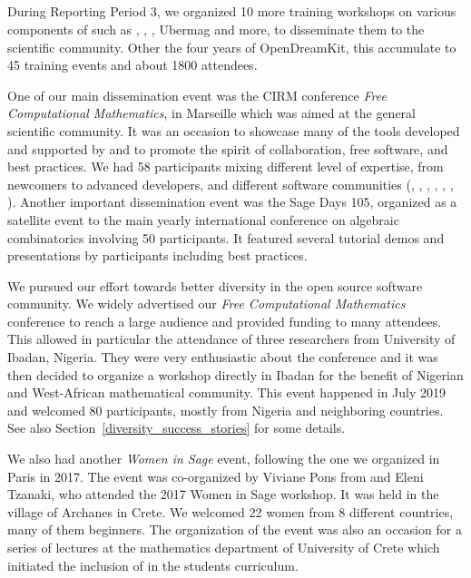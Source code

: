 {\subparagraph{}
\label{dissem@dissemination}

During Reporting Period 3, we organized 10 more training workshops on
various components of \ODK such as \Sage, \Jupyter, \GAP, Ubermag and
more, to disseminate them to the scientific community. Other the four
years of OpenDreamKit, this accumulate to 45 training events and about
1800 attendees.


One of our main dissemination event was the CIRM conference \emph{Free Computational Mathematics}, in Marseille which was aimed at the general scientific community.  It was an occasion to showcase  many of the tools developed and supported by \ODK and to promote the spirit of collaboration, free software, and best practices. We had 58 participants mixing different level of expertise, from newcomers to advanced developers, and different software communities (\GAP, \Jupyter, \Linbox,  \MPIR, \PariGP, \Sage, \Singular). Another important dissemination event was the Sage Days 105, organized as a satellite event to the main yearly international conference  on algebraic combinatorics involving 50 participants. It featured several tutorial demos and presentations by \ODK participants including best practices.

We pursued our effort towards better diversity in the open source software community. We widely advertised our
  \emph{Free Computational Mathematics} conference to reach a large audience and provided funding to many attendees.
  This allowed in particular the attendance of three researchers from University of Ibadan, Nigeria. They were very enthusiastic
  about the conference and it was then decided to organize a \Sage workshop directly in Ibadan for the benefit of Nigerian and
  West-African mathematical community. This event happened in July 2019 and welcomed 80 participants, mostly from Nigeria and
  neighboring countries.
  See also Section~\ref{diversity_success_stories} for some details.

  We also had another \emph{Women in Sage} event, following the one we organized in Paris in 2017. The event was co-organized
  by Viviane Pons from \ODK and Eleni Tzanaki, who attended the 2017 Women in Sage workshop. It was held in the village of Archanes
  in Crete. We welcomed 22 women from 8 different countries, many of them \Sage beginners. The organization of the event was also
  an occasion for a series of \Sage lectures at the mathematics department of University of Crete which initiated the inclusion of \Sage
  in the students curriculum.


}

